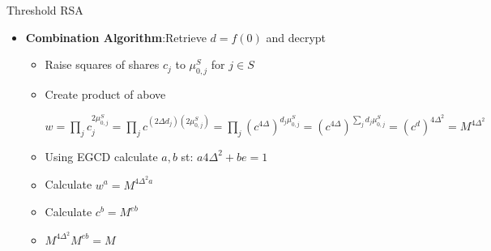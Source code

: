 \documentclass{beamer}
\begin{document}
\begin{frame}[allowframebreaks]{Threshold RSA \cite{Shoup:2000:PTS:1756169.1756190}}
\begin{itemize}
\framebreak

\item \textbf{Combination Algorithm}:Retrieve $d=f(0)$ and decrypt 

\begin{itemize}
\item Raise squares of shares $c_j$ to $\mu^S_{0,j}$ for $j \in S$ 
\item Create product of above 
  
\begin{center}
$ 
 w = \prod_j c_j^{2  \mu^S_{0,j}}    
   = \prod_j c^{(2  \Delta  d_j)  (2  \mu^S_{0,j}) }  
   = \prod_j (c^{4  \Delta})^{d_j  \mu^S_{0,j}}  
   = (c^{4  \Delta})^{\sum_j d_j  \mu^S_{0,j}}  
   = (c^d)^{4  \Delta^2} 
   = M^{4  \Delta^2} 
$  
  
\end{center}
\item Using EGCD calculate $a,b$ st: $a  4\Delta^2 + b  e =1$
\item Calculate $w^a= M^{4  \Delta^2  a}$
\item Calculate $c^b = M^{e  b}$
\item $M^{4  \Delta^2}  M^{e  b} = M$
\end{itemize}
\end{itemize}
\end{frame}
\end{document}
